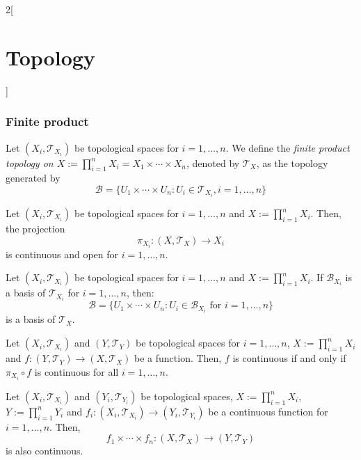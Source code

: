 \documentclass[../../../main.tex]{subfiles}
\begin{document}
\begin{multicols}{2}[\section{Topology}]
  \subsubsection{Finite product}
  \begin{definition}
    Let $(X_i,\mathcal{T}_{X_i})$ be topological spaces for $i=1,\ldots,n$. We define the \textit{finite product topology on $X:=\prod_{i=1}^nX_i=X_1\times \cdots\times X_n$}, denoted by $\mathcal{T}_X$, as the topology generated by $$\mathcal{B}=\{U_1\times\cdots\times U_n :U_i\in\mathcal{T}_{X_i},i=1,\ldots,n\}$$
  \end{definition}
  \begin{prop}
    Let $(X_i,\mathcal{T}_{X_i})$ be topological spaces for $i=1,\ldots,n$ and $X:=\prod_{i=1}^nX_i$. Then, the projection $$\pi_{X_i}:\left(X,\mathcal{T}_X\right)\longrightarrow X_i$$
    is continuous and open for $i=1,\ldots,n$.
  \end{prop}
  \begin{prop}
    Let $(X_i,\mathcal{T}_{X_i})$ be topological spaces for $i=1,\ldots,n$ and $X:=\prod_{i=1}^nX_i$. If $\mathcal{B}_{X_i}$ is a basis of $\mathcal{T}_{X_i}$ for $i=1,\ldots,n$, then: $$\mathcal{B}=\{U_1\times\cdots\times U_n :U_i\in\mathcal{B}_{X_i}\text{ for }i=1,\ldots,n\}$$
    is a basis of $\mathcal{T}_X$.
  \end{prop}
  \begin{prop}
    Let $(X_i,\mathcal{T}_{X_i})$ and $(Y,\mathcal{T}_Y)$ be topological spaces for $i=1,\ldots,n$, $X:=\prod_{i=1}^nX_i$ and $f:(Y,\mathcal{T}_Y)\rightarrow(X,\mathcal{T}_X)$ be a function. Then, $f$ is continuous if and only if $\pi_{X_i}\circ f$ is continuous for all $i=1,\ldots,n$.
  \end{prop}
  \begin{prop}
    Let $(X_i,\mathcal{T}_{X_i})$ and $(Y_i,\mathcal{T}_{Y_i})$ be topological spaces, $X:=\prod_{i=1}^nX_i$, $Y:=\prod_{i=1}^nY_i$ and $f_i:(X_i,\mathcal{T}_{X_i})\rightarrow(Y_i,\mathcal{T}_{Y_i})$ be a continuous function for $i=1,\ldots,n$. Then, $$f_1\times\cdots\times f_n:\left(X,\mathcal{T}_X\right)\longrightarrow\left(Y,\mathcal{T}_Y\right)$$ is also continuous.
  \end{prop}

\end{multicols}
\end{document}
